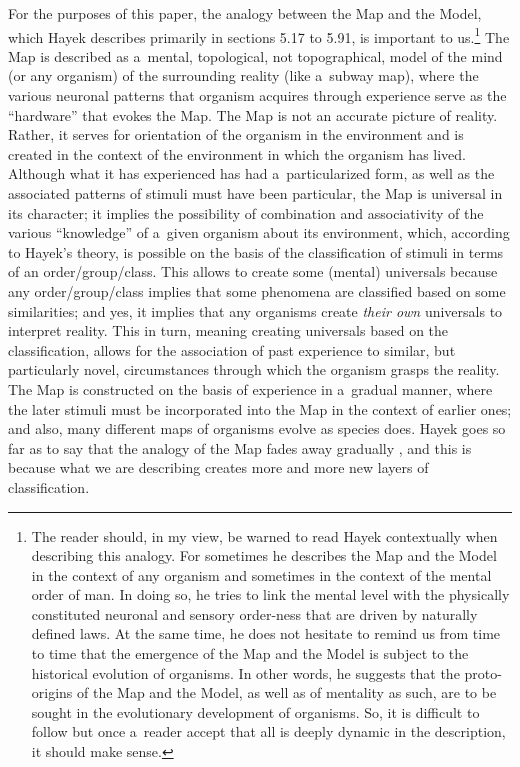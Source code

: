 For the purposes of this paper, the analogy between the Map and the Model, which Hayek 
\parencite*[][]{} %
 describes primarily in sections 5.17 to 5.91, is important to us.\footnote{The reader should, in my view, be warned to read Hayek contextually when describing this analogy. For sometimes he describes the Map and the Model in the context of any organism and sometimes in the context of the mental order of man. In doing so, he tries to link the mental level with the physically constituted neuronal and sensory order-ness that are driven by naturally defined laws. At the same time, he does not hesitate to remind us from time to time that the emergence of the Map and the Model is subject to the historical evolution of organisms. In other words, he suggests that the proto-origins of the Map and the Model, as well as of mentality as such, are to be sought in the evolutionary development of organisms. So, it is difficult to follow but once a~reader accept that all is deeply dynamic in the description, it should make sense.} The Map is described as a~mental, topological, not topographical, model of the mind (or any organism) of the surrounding reality (like a~subway map), where the various neuronal patterns that organism acquires through experience serve as the ``hardware'' that evokes the Map. The Map is not an accurate picture of reality. Rather, it serves for orientation of the organism in the environment and is created in the context of the environment in which the organism has lived. Although what it has experienced has had a~particularized form, as well as the associated patterns of stimuli must have been particular, the Map is universal in its character; it implies the possibility of combination and associativity of the various ``knowledge'' of a~given organism about its environment, which, according to Hayek's theory, is possible on the basis of the classification of stimuli in terms of an order/group/class. This allows to create some (mental) universals because any order/group/class implies that some phenomena are classified based on some similarities; and yes, it implies that any organisms create \textit{their own} universals to interpret reality. This in turn, meaning creating universals based on the classification, allows for the association of past experience to similar, but particularly novel, circumstances through which the organism grasps the reality. The Map is constructed on the basis of experience in a~gradual manner, where the later stimuli must be incorporated into the Map in the context of earlier ones; and also, many different maps of organisms evolve as species does. Hayek goes so far as to say that the analogy of the Map fades away gradually 
\parencite[][sec.5.30]{}, %
 and this is because what we are describing creates more and more new layers of classification.



